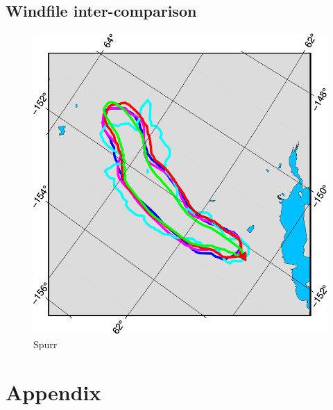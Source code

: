 \documentclass[11pt]{article}   %
\begin{document}
\subsection{Windfile inter-comparison}
\begin{figure}[htbp]\begin{center}
 \includegraphics[angle=-90,scale=0.8]{Figs/Depo_Compar_221.pdf}
 \parbox{15cm}{\caption{\label{FigSpurrDepoComp}
 Spurr
 }}
\end{center}\end{figure}


\clearpage
\section{Appendix}
\end{document}

